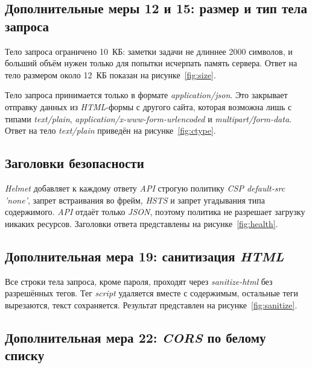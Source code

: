\documentclass{stp}
\begin{document}
\subsection{Дополнительные меры 12 и 15: размер и тип тела запроса}

Тело запроса ограничено 10~КБ: заметки задачи не длиннее 2000 символов,
и больший объём нужен только для попытки исчерпать память сервера.
Ответ на тело размером около 12~КБ показан на рисунке~\ref{fig:size}.


Тело запроса принимается только в формате \textit{application/json}. Это
закрывает отправку данных из \textit{HTML}-формы с другого сайта, которая
возможна лишь с типами \textit{text/plain}, \textit{application/x-www-form-urlencoded} и
\textit{multipart/form-data}. Ответ на тело \textit{text/plain} приведён на
рисунке~\ref{fig:ctype}.


\subsection{Заголовки безопасности}

\textit{Helmet} добавляет к каждому ответу \textit{API} строгую политику \textit{CSP default-src 'none'}, запрет встраивания во фрейм, \textit{HSTS} и запрет
угадывания типа содержимого. \textit{API} отдаёт только \textit{JSON}, поэтому политика не
разрешает загрузку никаких ресурсов. Заголовки ответа представлены на
рисунке~\ref{fig:health}.


\subsection{Дополнительная мера 19: санитизация \textit{HTML}}

Все строки тела запроса, кроме пароля, проходят через \textit{sanitize-html} без
разрешённых тегов. Тег \textit{script} удаляется вместе с содержимым, остальные
теги вырезаются, текст сохраняется. Результат представлен на
рисунке~\ref{fig:sanitize}.


\subsection{Дополнительная мера 22: \textit{CORS} по белому списку}
\end{document}
